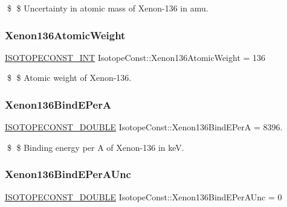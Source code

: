 \$ \$ Uncertainty in atomic mass of Xenon-\/136 in amu. \mbox{\label{group___isotope_const-_xenon-_xe136_ga279bf3d2ad4d5629e479d5845ee2bdfb}} 
\subsubsection{\texorpdfstring{Xenon136\+Atomic\+Weight}{Xenon136AtomicWeight}}
{\footnotesize\ttfamily \mbox{\hyperlink{group___isotope_const-_macros_ga5f18360b3e99483a35c32d789e62621c}{I\+S\+O\+T\+O\+P\+E\+C\+O\+N\+S\+T\+\_\+\+I\+NT}} Isotope\+Const\+::\+Xenon136\+Atomic\+Weight = 136}

\$ \$ Atomic weight of Xenon-\/136. \mbox{\label{group___isotope_const-_xenon-_xe136_ga69f59375607d66f7b8ea49295ef8a7f3}} 
\subsubsection{\texorpdfstring{Xenon136\+Bind\+E\+PerA}{Xenon136BindEPerA}}
{\footnotesize\ttfamily \mbox{\hyperlink{group___isotope_const-_macros_ga8f45a7272ce02c0b4c65c44636ed719a}{I\+S\+O\+T\+O\+P\+E\+C\+O\+N\+S\+T\+\_\+\+D\+O\+U\+B\+LE}} Isotope\+Const\+::\+Xenon136\+Bind\+E\+PerA = 8396.}

\$ \$ Binding energy per A of Xenon-\/136 in keV. \mbox{\label{group___isotope_const-_xenon-_xe136_ga1d1b86c5796d098a6f7885a4f460ac1f}} 
\subsubsection{\texorpdfstring{Xenon136\+Bind\+E\+Per\+A\+Unc}{Xenon136BindEPerAUnc}}
{\footnotesize\ttfamily \mbox{\hyperlink{group___isotope_const-_macros_ga8f45a7272ce02c0b4c65c44636ed719a}{I\+S\+O\+T\+O\+P\+E\+C\+O\+N\+S\+T\+\_\+\+D\+O\+U\+B\+LE}} Isotope\+Const\+::\+Xenon136\+Bind\+E\+Per\+A\+Unc = 0}

